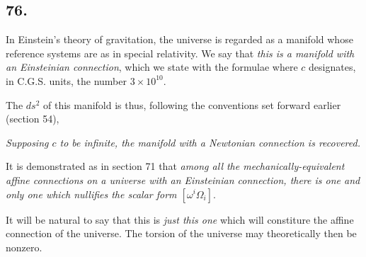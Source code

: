 \subsection*{76.}

In Einstein's theory of gravitation, the universe is regarded as a manifold whose reference systems are  as in special relativity. We say that \textit{this is a manifold with an Einsteinian connection}, which we state with the formulae
where $c$ designates, in C.G.S. units, the number $3\times 10^10$.

The $ds^2$ of this manifold is
thus, following the conventions set forward earlier (section 54),

\textit{Supposing $c$ to be infinite, the manifold with a Newtonian connection is recovered.}

It is demonstrated as in section 71 that \textit{among all the mechanically-equivalent affine connections on a universe with an Einsteinian connection, there is one and only one which nullifies the scalar form $[\omega^i \Omega_i]$}.

It will be natural to say that this is \textit{just this one} which will constiture the affine connection of the universe. The torsion of the universe may theoretically then be nonzero.